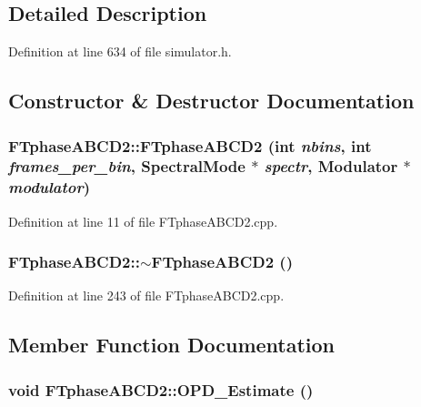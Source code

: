 \subsection{Detailed Description}


Definition at line 634 of file simulator.h.



\subsection{Constructor \& Destructor Documentation}
\hypertarget{classFTphaseABCD2_a53e40632beeadc5eb5c1f70a6bbce9f3}{
\subsubsection[{FTphaseABCD2}]{\setlength{\rightskip}{0pt plus 5cm}FTphaseABCD2::FTphaseABCD2 (int {\em nbins}, \/  int {\em frames\_\-per\_\-bin}, \/  {\bf SpectralMode} $\ast$ {\em spectr}, \/  {\bf Modulator} $\ast$ {\em modulator})}}
\label{classFTphaseABCD2_a53e40632beeadc5eb5c1f70a6bbce9f3}


Definition at line 11 of file FTphaseABCD2.cpp.

\hypertarget{classFTphaseABCD2_a52e1f405aa79ffacb0cd92da03e3c61e}{
\subsubsection[{$\sim$FTphaseABCD2}]{\setlength{\rightskip}{0pt plus 5cm}FTphaseABCD2::$\sim$FTphaseABCD2 ()}}
\label{classFTphaseABCD2_a52e1f405aa79ffacb0cd92da03e3c61e}


Definition at line 243 of file FTphaseABCD2.cpp.



\subsection{Member Function Documentation}
\hypertarget{classFTphaseABCD2_a9f110f8b7c7ea884961e746cdfe50e9d}{
\subsubsection[{OPD\_\-Estimate}]{\setlength{\rightskip}{0pt plus 5cm}void FTphaseABCD2::OPD\_\-Estimate ()}}
\label{classFTphaseABCD2_a9f110f8b7c7ea884961e746cdfe50e9d}


